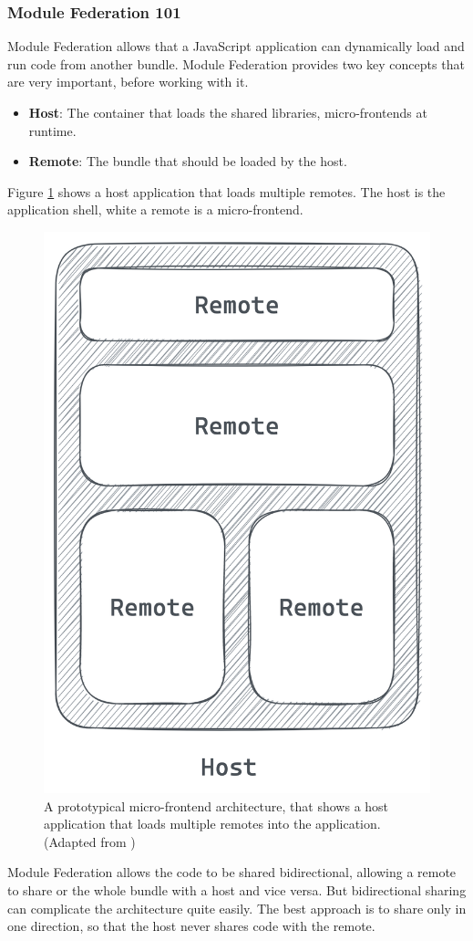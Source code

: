 \subsubsection{Module Federation 101}\label{subsubsection:background:micro-frontend:module-federation:101}

Module Federation allows that a JavaScript application can dynamically load and run code from another bundle. Module Federation provides two key concepts that are very important, before working with it. \cite[118-119]{book:2021:mezzalira:applied-methods:building-micro-frontends}

\begin{itemize}
    \item \textbf{Host}: The container that loads the shared libraries, micro-frontends at runtime.
    \item \textbf{Remote}: The bundle that should be loaded by the host.
\end{itemize}

\noindent Figure \ref{fig:background:micro-frontend:module-federation:module-federation-architecture} shows a host application that loads multiple remotes. The host is the application shell, white a remote is a micro-frontend.

\ifshowImages
\begin{figure}[H]
    \centering
    \includegraphics[width=0.3\linewidth]{images/module-federation-architecture.png}
    \caption{A prototypical micro-frontend architecture, that shows a host application that loads multiple remotes into the application. (Adapted from \cite[119]{book:2021:mezzalira:applied-methods:building-micro-frontends})
    }\label{fig:background:micro-frontend:module-federation:module-federation-architecture}
\end{figure}
\fi

\noindent Module Federation allows the code to be shared bidirectional, allowing a remote to share or the whole bundle with a host and vice versa. But bidirectional sharing can complicate the architecture quite easily. The best approach is to share only in one direction, so that the host never shares code with the remote. \cite[119]{book:2021:mezzalira:applied-methods:building-micro-frontends}

